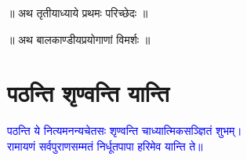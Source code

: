 \vspace{4mm}
{}
\centering ॥ अथ तृतीयाध्याये प्रथमः परिच्छेदः ॥\nopagebreak\\
\vspace{4mm}
{}
\centering ॥ अथ बालकाण्डीयप्रयोगाणां विमर्शः ॥\nopagebreak\\
\fontsize{14}{21}\selectfont
\section[पठन्ति शृण्वन्ति यान्ति]{पठन्ति शृण्वन्ति यान्ति}
\centering\textcolor{blue}{पठन्ति ये नित्यमनन्यचेतसः शृण्वन्ति चाध्यात्मिकसञ्ज्ञितं शुभम्।\nopagebreak\\
रामायणं सर्वपुराणसम्मतं निर्धूतपापा हरिमेव यान्ति ते॥}\nopagebreak\\
\\

